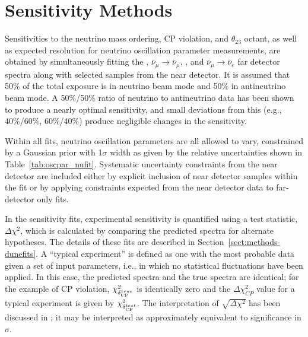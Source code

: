 \section{Sensitivity Methods}
\label{sec:physics-lbnosc-sens}




Sensitivities to the neutrino mass ordering, CP violation, and $\theta_{23}$ octant, as well as expected resolution for neutrino oscillation parameter measurements, are obtained by simultaneously fitting the \numutonumu, $\bar{\nu}_\mu \rightarrow \bar{\nu}_\mu$, \numutonue, and $\bar{\nu}_\mu \rightarrow \bar{\nu}_e$ far detector spectra along with selected samples from the near detector.  It is assumed that 50\% of the total exposure is in neutrino beam mode and 50\% in antineutrino beam mode.  A 50\%/50\% ratio of neutrino to antineutrino data has been shown to produce a nearly optimal sensitivity, and small deviations from this (e.g., 40\%/60\%, 60\%/40\%) produce negligible changes in the sensitivity.  

Within all fits, neutrino oscillation parameters are all allowed to vary, constrained by a Gaussian prior with 1$\sigma$ width as given by the relative uncertainties shown in Table~\ref{tab:oscpar_nufit}. Systematic uncertainty constraints from the near detector are included either by explicit inclusion of near detector samples within the fit or by applying constraints expected from the near detector data to far-detector only fits.

In the sensitivity fits, experimental sensitivity is quantified using a test statistic, $\Delta\chi^2$, which is calculated by comparing the predicted spectra for alternate hypotheses.  The details of these fits are described in Section~\ref{sect:methods-dunefits}. 
A ``typical experiment'' is defined as one with the most probable data given a set of input parameters, i.e., in which no statistical fluctuations have been applied. In this case, the predicted spectra and the true spectra are identical; for the example of CP violation, $\chi^2_{\delta_{\rm CP}^{true}}$ is identically zero and the $\Delta\chi^2_{CP}$ value for a typical experiment is given by $\chi^2_{\delta_{\rm CP}^{test}}$. The interpretation of $\sqrt{\Delta\chi^2}$ has been discussed in \cite{Qian:2012zn,Blennow:2013oma}; it may be interpreted as approximately equivalent to significance in $\sigma$. 


